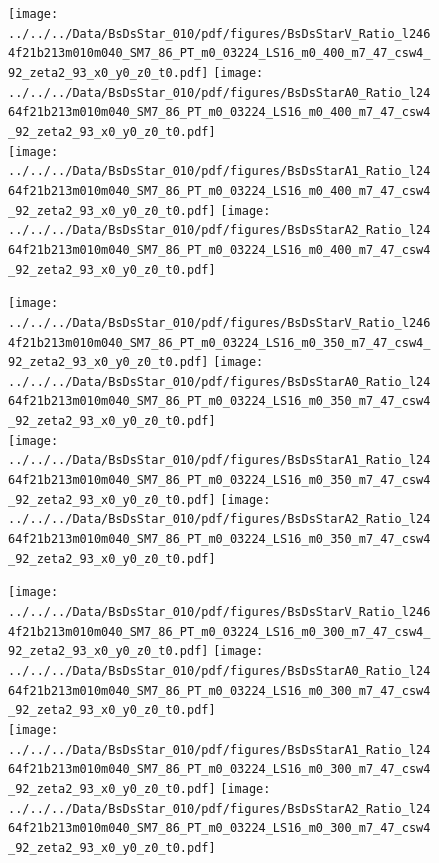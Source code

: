 \documentclass[a4paper,10pt]{article}
\begin{document}
\begin{figure}[p]
 \texttt{[image: ../../../Data/BsDsStar\_010/pdf/figures/BsDsStarV\_Ratio\_l2464f21b213m010m040\_SM7\_86\_PT\_m0\_03224\_LS16\_m0\_400\_m7\_47\_csw4\_92\_zeta2\_93\_x0\_y0\_z0\_t0.pdf]}  
\texttt{[image: ../../../Data/BsDsStar\_010/pdf/figures/BsDsStarA0\_Ratio\_l2464f21b213m010m040\_SM7\_86\_PT\_m0\_03224\_LS16\_m0\_400\_m7\_47\_csw4\_92\_zeta2\_93\_x0\_y0\_z0\_t0.pdf]} \\ 
\texttt{[image: ../../../Data/BsDsStar\_010/pdf/figures/BsDsStarA1\_Ratio\_l2464f21b213m010m040\_SM7\_86\_PT\_m0\_03224\_LS16\_m0\_400\_m7\_47\_csw4\_92\_zeta2\_93\_x0\_y0\_z0\_t0.pdf]}  
\texttt{[image: ../../../Data/BsDsStar\_010/pdf/figures/BsDsStarA2\_Ratio\_l2464f21b213m010m040\_SM7\_86\_PT\_m0\_03224\_LS16\_m0\_400\_m7\_47\_csw4\_92\_zeta2\_93\_x0\_y0\_z0\_t0.pdf]} \\ 
\end{figure} 
\clearpage

\begin{figure}[p]
 \texttt{[image: ../../../Data/BsDsStar\_010/pdf/figures/BsDsStarV\_Ratio\_l2464f21b213m010m040\_SM7\_86\_PT\_m0\_03224\_LS16\_m0\_350\_m7\_47\_csw4\_92\_zeta2\_93\_x0\_y0\_z0\_t0.pdf]}  
\texttt{[image: ../../../Data/BsDsStar\_010/pdf/figures/BsDsStarA0\_Ratio\_l2464f21b213m010m040\_SM7\_86\_PT\_m0\_03224\_LS16\_m0\_350\_m7\_47\_csw4\_92\_zeta2\_93\_x0\_y0\_z0\_t0.pdf]} \\ 
\texttt{[image: ../../../Data/BsDsStar\_010/pdf/figures/BsDsStarA1\_Ratio\_l2464f21b213m010m040\_SM7\_86\_PT\_m0\_03224\_LS16\_m0\_350\_m7\_47\_csw4\_92\_zeta2\_93\_x0\_y0\_z0\_t0.pdf]}  
\texttt{[image: ../../../Data/BsDsStar\_010/pdf/figures/BsDsStarA2\_Ratio\_l2464f21b213m010m040\_SM7\_86\_PT\_m0\_03224\_LS16\_m0\_350\_m7\_47\_csw4\_92\_zeta2\_93\_x0\_y0\_z0\_t0.pdf]} \\ 
\end{figure} 
\clearpage

\begin{figure}[p]
 \texttt{[image: ../../../Data/BsDsStar\_010/pdf/figures/BsDsStarV\_Ratio\_l2464f21b213m010m040\_SM7\_86\_PT\_m0\_03224\_LS16\_m0\_300\_m7\_47\_csw4\_92\_zeta2\_93\_x0\_y0\_z0\_t0.pdf]}  
\texttt{[image: ../../../Data/BsDsStar\_010/pdf/figures/BsDsStarA0\_Ratio\_l2464f21b213m010m040\_SM7\_86\_PT\_m0\_03224\_LS16\_m0\_300\_m7\_47\_csw4\_92\_zeta2\_93\_x0\_y0\_z0\_t0.pdf]} \\ 
\texttt{[image: ../../../Data/BsDsStar\_010/pdf/figures/BsDsStarA1\_Ratio\_l2464f21b213m010m040\_SM7\_86\_PT\_m0\_03224\_LS16\_m0\_300\_m7\_47\_csw4\_92\_zeta2\_93\_x0\_y0\_z0\_t0.pdf]}  
\texttt{[image: ../../../Data/BsDsStar\_010/pdf/figures/BsDsStarA2\_Ratio\_l2464f21b213m010m040\_SM7\_86\_PT\_m0\_03224\_LS16\_m0\_300\_m7\_47\_csw4\_92\_zeta2\_93\_x0\_y0\_z0\_t0.pdf]} \\ 
\end{figure} 
\clearpage
\end{document}
